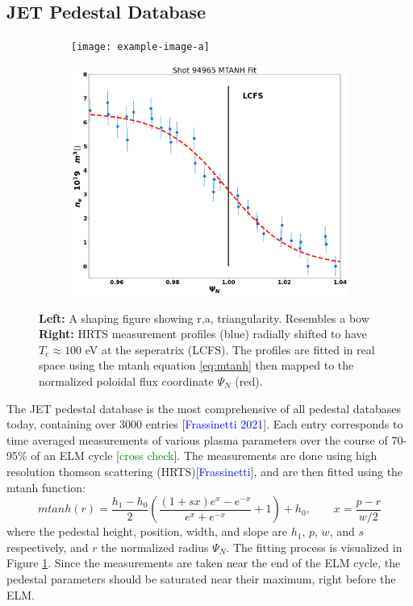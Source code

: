 \documentclass[a4paper, twoside, final, 12pt]{article}
\begin{document}
\subsection{JET Pedestal Database}
\begin{figure}
	\centering
	\begin{subfigure}{0.495\linewidth}
		\centering
		\texttt{[image: example-image-a]}
	\end{subfigure}
	\begin{subfigure}{0.495\linewidth}
		\centering
		\includegraphics[scale=0.2]{./src/MTANH_fit}
	\end{subfigure}\hfill
	\caption{ \textbf{Left:} A shaping figure showing r,a, triangularity. Resembles a bow \textbf{Right:} HRTS measurement profiles (blue) radially shifted to have $T_e \approx 100$ eV at the seperatrix (LCFS). The profiles are fitted in real space using the mtanh equation \ref{eq:mtanh} then mapped to the normalized poloidal flux coordinate $\Psi_N$ (red).}
	\label{fig:pedestal_db_figs}
\end{figure}

The JET pedestal database is the most comprehensive of all pedestal databases today, containing over 3000 entries [\textcolor{blue}{Frassinetti 2021}].
Each entry corresponds to time averaged measurements of various plasma parameters over the course of 70-95\% of an ELM cycle [\textcolor{green}{cross check}].
The measurements are done using high resolution thomson scattering (HRTS)[\textcolor{blue}{Frassinetti}], and are then fitted using the mtanh function: 
\begin{equation} \label{eq:mtanh}
mtanh(r) = \frac{h_1 - h_0}{2} \left( \frac{(1 + sx) e^x - e^{-x}}{e^x + e^{-x}} + 1\right) + h_0 , \quad \quad x=\frac{p-r}{w/2}
\end{equation}
where the pedestal height, position, width, and slope are $h_1$, $p$, $w$, and $s$ respectively, and $r$ the normalized radius $\Psi_N$. The fitting process is visualized in Figure \ref{fig:pedestal_db_figs}. 
Since the measurements are taken near the end of the ELM cycle, the pedestal parameters should be saturated near their maximum, right before the ELM.
\end{document}
